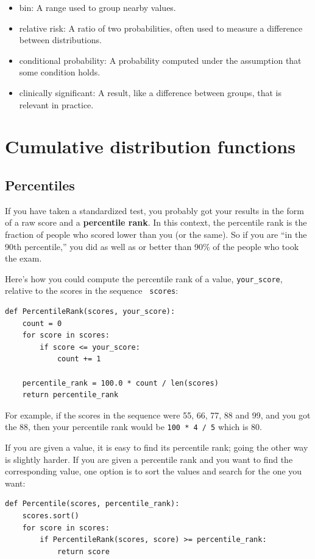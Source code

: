 \documentclass[12pt]{book}
\begin{document}
\begin{itemize}
\item bin: A range used to group nearby values.

\item relative risk: A ratio of two probabilities, often used to measure
a difference between distributions.

\item conditional probability: A probability computed under the assumption
that some condition holds.

\item clinically significant: A result, like a difference between groups,
that is relevant in practice.

\end{itemize}


\chapter{Cumulative distribution functions}
\label{cumulative}


\section{Percentiles}

If you have taken a standardized test, you probably got your
results in the form of a raw score and a {\bf percentile rank}.
In this context, the percentile rank is the fraction of people who
scored lower than you (or the same).  So if you are ``in the 90th
percentile,'' you did as well as or better than 90\% of the people who
took the exam.

Here's how you could compute the percentile rank of a value,
\verb"your_score", relative to the scores in the sequence {\tt
  scores}:
%
\begin{verbatim}
def PercentileRank(scores, your_score):
    count = 0
    for score in scores:
        if score <= your_score:
            count += 1

    percentile_rank = 100.0 * count / len(scores)
    return percentile_rank
\end{verbatim}
%
%
For example, if the scores in the sequence were 55, 66, 77, 88 and 99,
and you got the 88, then your percentile rank would be {\tt 100 * 4 / 5}
which is 80.

If you are given a value, it is easy to find its percentile rank; going
the other way is slightly harder.  If you are given a percentile rank
and you want to find the corresponding value, one option is to
sort the values and search for the one you want:
%
\begin{verbatim}
def Percentile(scores, percentile_rank):
    scores.sort()
    for score in scores:
        if PercentileRank(scores, score) >= percentile_rank:
            return score
\end{verbatim}
\end{document}
